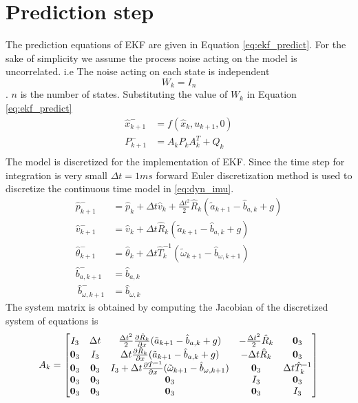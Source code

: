 \section{Prediction step}
The prediction equations of EKF are given in Equation \ref{eq:ekf_predict}. For the sake of simplicity we assume the process noise acting on the model is uncorrelated. i.e The noise acting on each state is independent $$W_k = I_n$$. $n$ is the number of states. Substituting the value of $W_k$ in Equation \ref{eq:ekf_predict}
\begin{equation}
\label{eq:imu_predict}
\begin{split}
\hat{x}_{k+1}^- &= f(\hat{x}_{k},u_{k+1},0)\\
P_{k+1}^- &= A_kP_{k}A_k^T + Q_{k}\\
\end{split}
\end{equation}
The model is discretized for the implementation of EKF. Since the time step for integration is very small $\Delta t = 1ms$ forward Euler discretization method is used to discretize the continuous time model in \ref{eq:dyn_imu}.
\begin{equation}
    \label{eq:dyn_imu_disc}
    \begin{split}
    \hat{p}_{k+1}^- &= \hat{p}_k + \Delta t \hat{v}_k + \frac{\Delta t^2}{2} \hat{R}_k (\tilde{a}_{k+1} - \hat{b}_{a,k} +g) \\
    \hat{v}_{k+1}^- &= \hat{v}_k + \Delta t \hat{R}_k (\tilde{a}_{k+1} - \hat{b}_{a,k} +g) \\
    \hat{\theta}_{k+1}^- &= \hat{\theta}_k + \Delta t \hat{T}_k^{-1}(\tilde{\omega}_{k+1} - \hat{b}_{\omega,k+1}) \\
    \hat{b}_{a,k+1}^- &= \hat{b}_{a,k}\\\
    \hat{b}_{\omega,k+1}^- &= \hat{b}_{\omega,k}
    \end{split}
\end{equation}
The system matrix is obtained by computing the Jacobian of the discretized system of equations is
\begin{equation}
    A_k = \begin{bmatrix}
    I_3 &\Delta t &\frac{\Delta t^2}{2} \frac{\partial {\hat{R}_k}}{\partial {x}}(\tilde{a}_{k+1} - \hat{b}_{a,k} +g) &-\frac{\Delta t^2}{2} \hat{R}_k &\textbf{0}_3 \\
    \textbf{0}_3 &I_3  &\Delta t \frac{\partial {\hat{R}_k}}{\partial {x}}(\tilde{a}_{k+1} - \hat{b}_{a,k} +g) &-\Delta t\hat{R}_k &\textbf{0}_3\\
    \textbf{0}_3  &\textbf{0}_3 &I_3 + \Delta t \frac{\partial {\hat{T}^{-1}}}{\partial {x}}(\tilde{\omega}_{k+1} - \hat{b}_{\omega,k+1}) &\textbf{0}_3 &\Delta t \hat{T}_k^{-1}\\
    \textbf{0}_3  &\textbf{0}_3  &\textbf{0}_3  &I_3 &\textbf{0}_3 \\
    \textbf{0}_3  &\textbf{0}_3  &\textbf{0}_3  &\textbf{0}_3 &I_3
    \end{bmatrix}
\end{equation}

